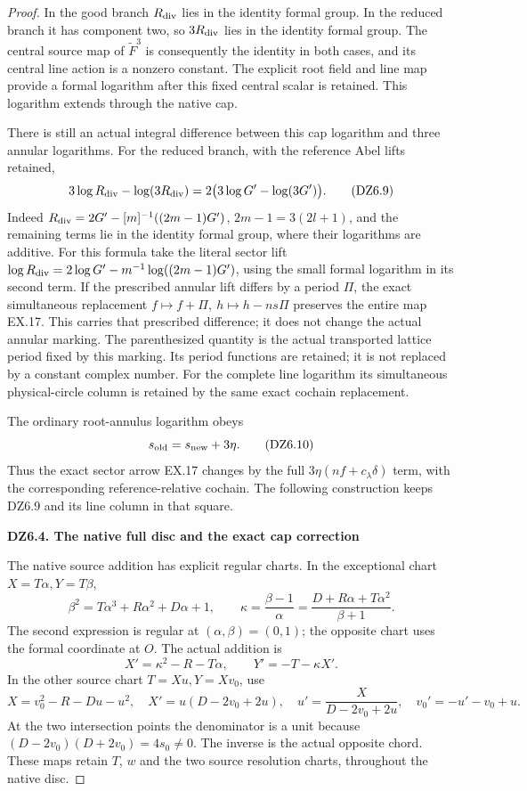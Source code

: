 \begin{proof}
In the good branch \(R_{\rm div}\) lies in the identity formal
group. In the reduced branch it has component two, so
\(3R_{\rm div}\) lies in the identity formal group. The
central source map of \(\widetilde F^3\) is consequently the
identity in both cases, and its central line action is a nonzero
constant. The explicit root field and line map provide a formal
logarithm after this fixed central scalar is retained. This
logarithm extends through the native cap.

There is still an actual integral difference between this cap
logarithm and three annular logarithms. For the reduced branch,
with the reference Abel lifts retained,
\[
 3\log R_{\rm div}-\log(3R_{\rm div})
     =2\bigl(3\log G'-\log(3G')\bigr).
 \tag{DZ6.9}
\]
Indeed \(R_{\rm div}=2G'-[m]^{-1}((2m-1)G')\),
\(2m-1=3(2l+1)\), and the remaining terms lie in the
identity formal group, where their logarithms are additive.
For this formula take the literal sector lift
\(\log R_{\rm div}=2\log G'-m^{-1}\log((2m-1)G')\), using
the small formal logarithm in its second term. If the prescribed
annular lift differs by a period \(\Pi\), the exact simultaneous
replacement \(f\mapsto f+\Pi,\ h\mapsto h-ns\Pi\) preserves
the entire map EX.17. This carries that prescribed difference;
it does not change the actual annular marking.
The parenthesized quantity is the actual transported lattice
period fixed by this marking. Its period functions are retained;
it is not replaced by a constant complex number. For the complete
line logarithm its simultaneous physical-circle column is retained
by the same exact cochain replacement.

The ordinary root-annulus logarithm obeys
\[
 s_{\rm old}=s_{\rm new}+3\eta.
 \tag{DZ6.10}
\]
Thus the exact sector arrow EX.17 changes by the full
\(3\eta(nf+c_\lambda\delta)\) term, with the corresponding
reference-relative cochain. The following construction keeps
DZ6.9 and its line column in that square.

\par

\medskip\noindent\textbf{DZ6.4. The native full disc and the exact cap correction}

\par\nobreak

The native source addition has explicit regular charts. In the
exceptional chart \(X=T\alpha,Y=T\beta\),
\[
 \beta^2=T\alpha^3+R\alpha^2+D\alpha+1,\qquad
 \kappa=\frac{\beta-1}{\alpha}
        =\frac{D+R\alpha+T\alpha^2}{\beta+1}.
\]
The second expression is regular at \((\alpha,\beta)=(0,1)\);
the opposite chart uses the formal coordinate at \(O\).
The actual addition is
\[
 X'=\kappa^2-R-T\alpha,\qquad Y'=-T-\kappa X'.
\]
In the other source chart \(T=Xu,Y=Xv_0\), use
\[
 X=v_0^2-R-Du-u^2,\quad
 X'=u(D-2v_0+2u),\quad
 u'=\frac{X}{D-2v_0+2u},\quad v_0'=-u'-v_0+u.
 \tag{DZ6.11}
\]
At the two intersection points the denominator is a unit because
\((D-2v_0)(D+2v_0)=4s_0\ne0\). The inverse is the actual
opposite chord. These maps retain \(T\), \(w\) and the two
source resolution charts, throughout the native disc.


\end{proof}
